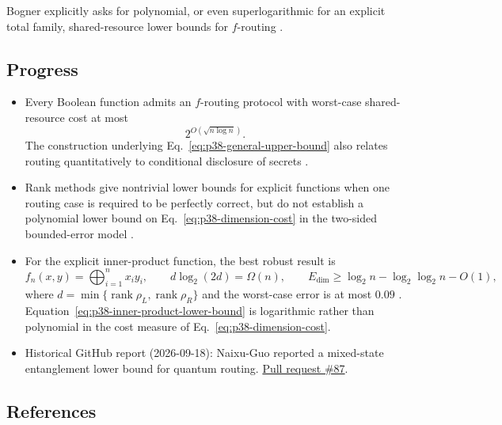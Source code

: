 Bogner explicitly asks for polynomial, or even superlogarithmic for an
explicit total family, shared-resource lower bounds for $f$-routing
.

\subsection*{Progress}

\begin{itemize}
  \item Every Boolean function admits an $f$-routing protocol with worst-case
  shared-resource cost at most
  \begin{equation}
    2^{O(\sqrt{n\log n})}.
    \label{eq:p38-general-upper-bound}
  \end{equation}
  The construction underlying Eq.~\eqref{eq:p38-general-upper-bound} also
  relates routing quantitatively to conditional disclosure of secrets
  .

  \item Rank methods give nontrivial lower bounds for explicit functions when
  one routing case is required to be perfectly correct, but do not establish
  a polynomial lower bound on Eq.~\eqref{eq:p38-dimension-cost} in the
  two-sided bounded-error model .

  \item For the explicit inner-product function, the best robust result is
  \begin{equation}
    f_n(x,y)=\bigoplus_{i=1}^n x_i y_i,
    \qquad
    d\log_2(2d)=\Omega(n),
    \qquad
    E_{\mathrm{dim}}\geq
      \log_2n-\log_2\log_2n-O(1),
    \label{eq:p38-inner-product-lower-bound}
  \end{equation}
  where $d=\min\{\operatorname{rank}\rho_L,
  \operatorname{rank}\rho_R\}$ and the worst-case error is at most $0.09$
  .
  Equation~\eqref{eq:p38-inner-product-lower-bound} is logarithmic rather than
  polynomial in the cost measure of Eq.~\eqref{eq:p38-dimension-cost}.

  \item Historical GitHub report (2026-09-18): Naixu-Guo reported a mixed-state entanglement lower bound for quantum routing. \href{https://github.com/Naixu-Guo/quantum-open-problems/pull/87}{Pull request \#87}.
\end{itemize}

\subsection*{References}

